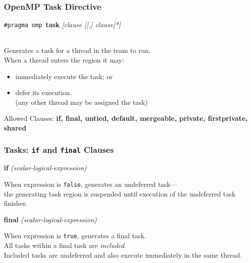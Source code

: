 \documentclass[aspectratio=43]{beamer}
\newenvironment{changemargin}[1]{%
  \begin{list}{}{%
    \setlength{\topsep}{0pt}%
    \setlength{\leftmargin}{#1}%
    \setlength{\rightmargin}{1em}
    \setlength{\listparindent}{\parindent}%
    \setlength{\itemindent}{\parindent}%
    \setlength{\parsep}{\parskip}%
  }%
  \item[]}{\end{list}}
\begin{document}
\begin{frame}
  \frametitle{OpenMP Task Directive}

  \begin{changemargin}{1.5cm}
  \begin{center}
    {\tt \#pragma omp }{\bf task} {\it [clause [[,] clause]*]}
  \end{center}~\\

     Generates a task for a thread in the team to run.\\[1em]
     When a thread enters the region it may:
      \begin{itemize}
        \item immediately execute the task; or
        \item defer its execution.\\\qquad  (any other thread may be assigned the task)
      \end{itemize}

  Allowed Clauses: {\bf if, final, untied, default, mergeable, private,
  firstprivate, shared}
  \end{changemargin}
\end{frame}

\begin{frame}
  \frametitle{Tasks: {\tt if} and {\tt final} Clauses}

  \begin{changemargin}{1.5cm}
  \begin{center}
  {\bf if} {\it(scalar-logical-expression)}
  \end{center}

    When expression is {\tt false}, generates an undeferred task---\\
    the generating task region is suspended until execution of the
      undeferred task finishes.\\[1em]

  \begin{center}
  {\bf final} {\it(scalar-logical-expression)}
  \end{center}

    When expression is {\tt true}, generates a final task.\\
    All tasks within a final task are {\it included}.\\
    Included tasks are undeferred and also execute immediately in the same thread.
  \end{changemargin}
\end{frame}
\end{document}
